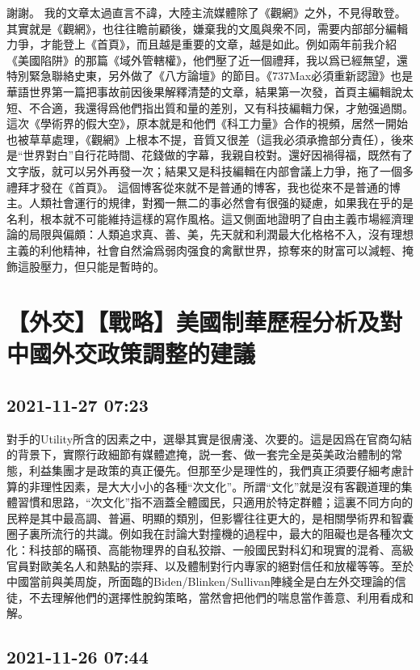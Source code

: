 \documentclass[twocolumn]{ctexart}
\begin{document}
謝謝。
我的文章太過直言不諱，大陸主流媒體除了《觀網》之外，不見得敢登。其實就是《觀網》，也往往瞻前顧後，嫌棄我的文風與衆不同，需要内部部分編輯力爭，才能登上《首頁》，而且越是重要的文章，越是如此。例如兩年前我介紹《美國陷阱》的那篇《域外管轄權》，他們壓了近一個禮拜，我以爲已經無望，還特別緊急聯絡史東，另外做了《八方論壇》的節目。《737Max必須重新認證》也是華語世界第一篇把事故前因後果解釋清楚的文章，結果第一次發，首頁主編輯說太短、不合適，我還得爲他們指出質和量的差別，又有科技編輯力保，才勉强過關。這次《學術界的假大空》，原本就是和他們《科工力量》合作的視頻，居然一開始也被草草處理，《觀網》上根本不提，音質又很差（這我必須承擔部分責任），後來是“世界對白”自行花時間、花錢做的字幕，我親自校對。還好因禍得福，既然有了文字版，就可以另外再發一次；結果又是科技編輯在内部會議上力爭，拖了一個多禮拜才發在《首頁》。
這個博客從來就不是普通的博客，我也從來不是普通的博主。人類社會運行的規律，對獨一無二的事必然會有很强的疑慮，如果我在乎的是名利，根本就不可能維持這樣的寫作風格。這又側面地證明了自由主義市場經濟理論的局限與偏頗：人類追求真、善、美，先天就和利潤最大化格格不入，沒有理想主義的利他精神，社會自然淪爲弱肉强食的禽獸世界，掠奪來的財富可以減輕、掩飾這股壓力，但只能是暫時的。
\section*{【外交】【戰略】美國制華歷程分析及對中國外交政策調整的建議}
\subsection*{2021-11-27 07:23}

對手的Utility所含的因素之中，選舉其實是很膚淺、次要的。這是因爲在官商勾結的背景下，實際行政細節有媒體遮掩，説一套、做一套完全是英美政治體制的常態，利益集團才是政策的真正優先。但那至少是理性的，我們真正須要仔細考慮計算的非理性因素，是大大小小的各種“次文化”。所謂“文化”就是沒有客觀道理的集體習慣和思路，“次文化”指不涵蓋全體國民，只適用於特定群體；這裏不同方向的民粹是其中最高調、普遍、明顯的類別，但影響往往更大的，是相關學術界和智囊圈子裏所流行的共識。例如我在討論大對撞機的過程中，最大的阻礙也是各種次文化：科技部的瞞頇、高能物理界的自私狡辯、一般國民對科幻和現實的混肴、高級官員對歐美名人和熱點的崇拜、以及體制對行内專家的絕對信任和放權等等。至於中國當前與美周旋，所面臨的Biden/Blinken/Sullivan陣綫全是白左外交理論的信徒，不去理解他們的選擇性脫鈎策略，當然會把他們的喘息當作善意、利用看成和解。
\subsection*{2021-11-26 07:44}
\end{document}
